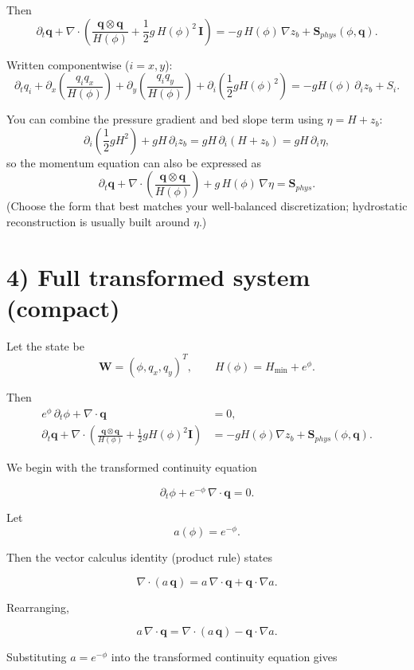 \documentclass[11pt]{article}
\begin{document}
Then
\[
\boxed{
\partial_t \mathbf{q}
+\nabla\cdot\!\left(\frac{\mathbf{q}\otimes\mathbf{q}}{H(\phi)}
+\frac{1}{2}g\,H(\phi)^2\,\mathbf{I}\right)
=
-g\,H(\phi)\,\nabla z_b
+\mathbf{S}_{phys}(\phi,\mathbf{q})
}.
\]

Written componentwise ($i=x,y$):
\[
\partial_t q_i
+
\partial_x\!\left(\frac{q_i q_x}{H(\phi)}\right)
+
\partial_y\!\left(\frac{q_i q_y}{H(\phi)}\right)
+
\partial_i\!\left(\frac{1}{2}gH(\phi)^2\right)
=
-gH(\phi)\,\partial_i z_b
+S_i.
\]

You can combine the pressure gradient and bed slope term using $\eta=H+z_b$:
\[
\partial_i\!\left(\frac{1}{2}gH^2\right)+gH\,\partial_i z_b
= gH\,\partial_i(H+z_b)=gH\,\partial_i\eta,
\]
so the momentum equation can also be expressed as
\[
\boxed{
\partial_t \mathbf{q}
+\nabla\cdot\!\left(\frac{\mathbf{q}\otimes\mathbf{q}}{H(\phi)}\right)
+g\,H(\phi)\,\nabla \eta
=
\mathbf{S}_{phys}
}.
\]
(Choose the form that best matches your well-balanced discretization; hydrostatic reconstruction is usually built around $\eta$.)

\section*{4) Full transformed system (compact)}

Let the state be
\[
\mathbf{W}=(\phi,q_x,q_y)^T,\qquad H(\phi)=H_{\min}+e^{\phi}.
\]

Then
\[
\boxed{
\begin{aligned}
e^{\phi}\,\partial_t\phi+\nabla\cdot\mathbf{q}&=0,\\[4pt]
\partial_t \mathbf{q}
+\nabla\cdot\!\left(\frac{\mathbf{q}\otimes\mathbf{q}}{H(\phi)}
+\frac{1}{2}gH(\phi)^2\mathbf{I}\right)
&=-gH(\phi)\nabla z_b+\mathbf{S}_{phys}(\phi,\mathbf{q}).
\end{aligned}
}
\]

We begin with the transformed continuity equation

\[
\partial_t\phi + e^{-\phi}\,\nabla\cdot\mathbf{q} = 0.
\]

Let 
\[
a(\phi)=e^{-\phi}.
\]

Then the vector calculus identity (product rule) states

\[
\nabla\cdot(a\,\mathbf{q}) 
= a\,\nabla\cdot\mathbf{q} + \mathbf{q}\cdot\nabla a.
\]

Rearranging,

\[
a\,\nabla\cdot\mathbf{q}
=
\nabla\cdot(a\,\mathbf{q})
-
\mathbf{q}\cdot\nabla a.
\]

Substituting $a = e^{-\phi}$ into the transformed continuity equation gives
\end{document}
